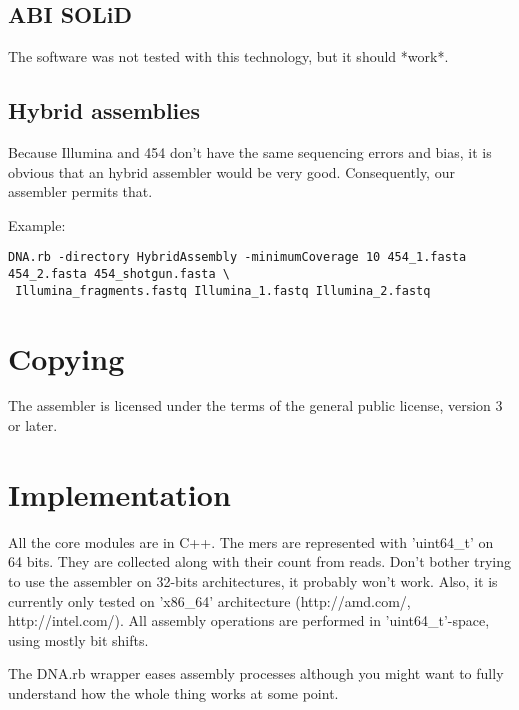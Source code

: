 \documentclass{article}
\begin{document}
\subsection{ABI SOLiD}

The software was not tested with this technology, but it should *work*.

\subsection{Hybrid assemblies}

Because Illumina and 454 don't have the same sequencing errors  and bias, it is obvious that
an hybrid assembler would be very good. Consequently, our assembler permits that.

Example:
\begin{verbatim}
DNA.rb -directory HybridAssembly -minimumCoverage 10 454_1.fasta 454_2.fasta 454_shotgun.fasta \
 Illumina_fragments.fastq Illumina_1.fastq Illumina_2.fastq 
\end{verbatim}


\section{Copying}

The assembler is licensed under the terms of the general public license, version 3 or later.

\section{Implementation}

All the core modules are in C++. The mers are represented with 'uint64\_t' on 64 bits. They are collected along with their  count from reads.
Don't bother trying to use the assembler on 32-bits architectures, it probably won't work. Also, it is currently only tested on
'x86\_64' architecture (http://amd.com/, http://intel.com/). 
All assembly operations are performed in 'uint64\_t'-space, using mostly bit shifts.

The DNA.rb wrapper eases assembly processes although you might want to fully understand how the whole thing works at some point.
\end{document}
